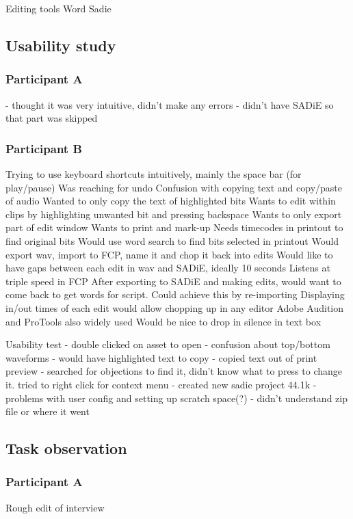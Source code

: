 Editing tools
Word
Sadie

\subsection{Usability study}

\subsubsection{Participant A}
- thought it was very intuitive, didn't make any errors
- didn't have SADiE so that part was skipped

\subsubsection{Participant B}

Trying to use keyboard shortcuts intuitively, mainly the space bar (for
play/pause)
Was reaching for undo
Confusion with copying text and copy/paste of audio
Wanted to only copy the text of highlighted bits
Wants to edit within clips by highlighting unwanted bit and pressing backspace
Wants to only export part of edit window
Wants to print and mark-up
Needs timecodes in printout to find original bits
Would use word search to find bits selected in printout
Would export wav, import to FCP, name it and chop it back into edits
Would like to have gaps between each edit in wav and SADiE, ideally 10 seconds
Listens at triple speed in FCP
After exporting to SADiE and making edits, would want to come back to get words
for script. Could achieve this by re-importing
Displaying in/out times of each edit would allow chopping up in any editor
Adobe Audition and ProTools also widely used
Would be nice to drop in silence in text box

Usability test
- double clicked on asset to open
- confusion about top/bottom waveforms
- would have highlighted text to copy
- copied text out of print preview
- searched for objections to find it, didn't know what to press to change it.
tried to right click for context menu
- created new sadie project 44.1k
- problems with user config and setting up scratch space(?)
- didn't understand zip file or where it went

\subsection{Task observation}

\subsubsection{Participant A}
Rough edit of interview

